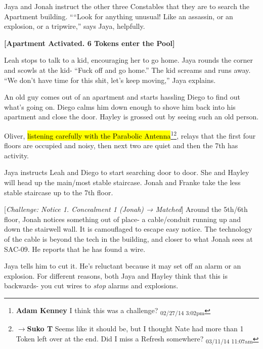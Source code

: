 Jaya and Jonah instruct the other three Constables that they are to search the Apartment building.  ````Look for anything unusual!  Like an assassin, or an explosion, or a tripwire,'' says Jaya, helpfully.  



\textbf{{[}Apartment Activated.  6 Tokens enter the Pool{]}}



Leah stops to talk to a kid, encouraging her to go home.  Jaya rounds the corner and scowls at the kid- ``Fuck off and go home.''  The kid screams and runs away.  ``We don't have time for this shit, let's keep moving,'' Jaya explains.



An old guy comes out of an apartment and starts hassling Diego to find out what's going on.  Diego calms him down enough to shove him back into his apartment and close the door.  Hayley is grossed out by seeing such an old person.



Oliver, \hl{listening carefully with the Parabolic Antenna}\footnote{\textbf{Adam Kenney }I think this was a challenge? \textsubscript{02/27/14 3:02pm}}\footnote{$\rightarrow$\textbf{Suko T }Seems like it should be, but I thought Nate had more than 1 Token left over at the end.  Did I miss a Refresh somewhere? \textsubscript{03/11/14 11:07am}}, relays that the first four floors are occupied and noisy, then next two are quiet and then the 7th has activity.  



Jaya instructs Leah and Diego to start searching door to door.  She and Hayley will head up the main/most stable staircase.  Jonah and Franke take the less stable staircase up to the 7th floor.



{[}\textit{Challenge: Notice 1. Concealment 1 (Jonah) → Matched}{]} Around the 5th/6th floor, Jonah notices something out of place- a cable/conduit running up and down the stairwell wall.  It is camouflaged to escape easy notice.  The technology of the cable is beyond the tech in the building, and closer to what Jonah sees at SAC-09.  He reports that he has found a wire.



Jaya tells him to cut it.  He's reluctant because it may set off an alarm or an explosion.  For different reasons, both Jaya and Hayley think that this is backwards- you cut wires to \textit{stop }alarms and explosions.



